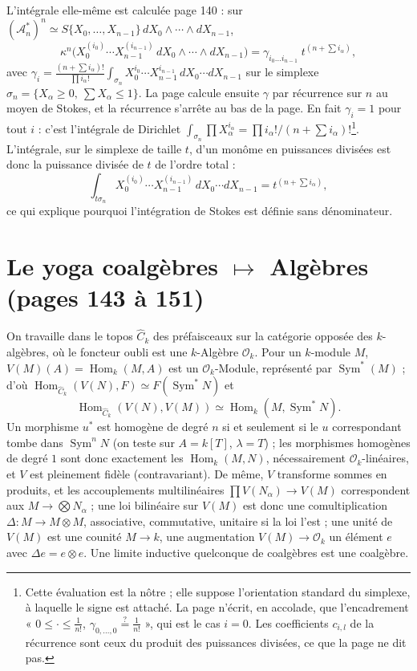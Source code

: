 \documentclass[11pt,a4paper]{article}
\begin{document}
L'intégrale elle-même est calculée page 140 : sur $(\mathcal{A}^*_n)^n \simeq
S\{X_0,\ldots,X_{n-1}\}\, dX_0\wedge\cdots\wedge dX_{n-1}$,
\[
\kappa^n\bigl(X_0^{(i_0)} \cdots X_{n-1}^{(i_{n-1})}\, dX_0 \wedge \cdots \wedge dX_{n-1}\bigr) = \gamma_{i_0 \ldots i_{n-1}}\; t^{(n + \sum i_\alpha)} ,
\]
avec $\gamma_{i} = \frac{(n+\sum i_\alpha)!}{\prod i_\alpha!} \int_{\sigma_n}
X_0^{i_0}\cdots X_{n-1}^{i_{n-1}}\,dX_0\cdots dX_{n-1}$ sur le simplexe $\sigma_n
= \{X_\alpha \geq 0,\ \sum X_\alpha \leq 1\}$. La page calcule ensuite $\gamma$
par récurrence sur $n$ au moyen de Stokes, et la récurrence s'arrête au bas de
la page. En fait $\gamma_i = 1$ pour tout $i$ : c'est l'intégrale de Dirichlet
$\int_{\sigma_n} \prod X_\alpha^{i_\alpha} = \prod i_\alpha! / (n + \sum
i_\alpha)!$\footnote{Cette évaluation est la nôtre ; elle suppose l'orientation
standard du simplexe, à laquelle le signe est attaché. La page n'écrit, en
accolade, que l'encadrement « $0 \leq \cdot \leq \frac{1}{n!}$,
$\gamma_{0,\ldots,0} \overset{?}{=} \frac{1}{n!}$ », qui est le cas $i = 0$.
Les coefficients $c_{i,l}$ de la récurrence sont ceux du produit des
puissances divisées, ce que la page ne dit pas.}. L'intégrale, sur le simplexe
de taille $t$, d'un monôme en puissances divisées est donc la puissance divisée
de $t$ de l'ordre total :
\[
\int_{t\sigma_n} X_0^{(i_0)} \cdots X_{n-1}^{(i_{n-1})}\, dX_0\cdots dX_{n-1} = t^{(n + \sum i_\alpha)} ,
\]
ce qui explique pourquoi l'intégration de Stokes est définie sans dénominateur.

\section*{Le yoga coalgèbres $\mapsto$ Algèbres (pages 143 à 151)}

On travaille dans le topos $\widehat{C}_k$ des préfaisceaux sur la catégorie
opposée des $k$-algèbres, où le foncteur oubli est une $k$-Algèbre
$\mathcal{O}_k$. Pour un $k$-module $M$, $V(M)(A) = \operatorname{Hom}_k(M, A)$
est un $\mathcal{O}_k$-Module, représenté par $\operatorname{Sym}^*(M)$ ; d'où
$\operatorname{Hom}_{\widehat{C}_k}(V(N), F) \simeq F(\operatorname{Sym}^* N)$ et
\[
\operatorname{Hom}_{\widehat{C}_k}(V(N), V(M)) \simeq \operatorname{Hom}_k(M, \operatorname{Sym}^* N) .
\]
Un morphisme $u^*$ est homogène de degré $n$ si et seulement si le $u$
correspondant tombe dans $\operatorname{Sym}^n N$ (on teste sur $A = k[T]$,
$\lambda = T$) ; les morphismes homogènes de degré $1$ sont donc exactement les
$\operatorname{Hom}_k(M, N)$, nécessairement $\mathcal{O}_k$-linéaires, et $V$
est pleinement fidèle (contravariant). De même, $V$ transforme sommes en
produits, et les accouplements multilinéaires $\prod V(N_\alpha) \to V(M)$
correspondent aux $M \to \bigotimes N_\alpha$ ; une loi bilinéaire sur $V(M)$
est donc une comultiplication $\Delta : M \to M \otimes M$, associative,
commutative, unitaire si la loi l'est ; une unité de $V(M)$ est une counité $M
\to k$, une augmentation $V(M) \to \mathcal{O}_k$ un élément $e$ avec $\Delta e =
e \otimes e$. Une limite inductive quelconque de coalgèbres est une coalgèbre.
\end{document}
